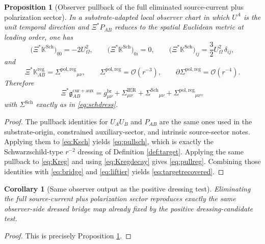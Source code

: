 \documentclass[11pt]{article}
\newcommand{\BridgeMetric}{\mathfrak g}
\newcommand{\ObserverMap}{\Xi}
\newcommand{\ProjSub}{P}
\newcommand{\CoulPot}{U_\Omega}
\newcommand{\SigmaIER}{\Sigma^{\mathrm{IER}}}
\newcommand{\SigmaDressSch}{\Sigma^{\mathrm{Sch}}}
\newcommand{\SigmaRegPol}{\Sigma^{\mathrm{pol,reg}}}
\newcommand{\AuxPol}{\mathbb K}
\newtheorem{proposition}{Proposition}
\newtheorem{corollary}{Corollary}
\begin{document}
\begin{proposition}[Observer pullback of the full eliminated source-current plus polarization sector]
\label{prop:pullback}
In a substrate-adapted local observer chart in which \(U^A\) is the unit temporal direction and \(\ObserverMap^\ast\ProjSub_{AB}\) reduces to the spatial Euclidean metric at leading order, one has
\begin{equation}
\bigl(\ObserverMap^\ast\AuxPol^{\mathrm{Sch}}\bigr)_{00}
=
-2\CoulPot^2,
\qquad
\bigl(\ObserverMap^\ast\AuxPol^{\mathrm{Sch}}\bigr)_{0i}
=
0,
\qquad
\bigl(\ObserverMap^\ast\AuxPol^{\mathrm{Sch}}\bigr)_{ij}
=
\frac32\CoulPot^2\,\delta_{ij},
\label{eq:pullsch}
\end{equation}
and
\begin{equation}
\ObserverMap^\ast\AuxPol_{AB}^{\mathrm{reg}}
=
\SigmaRegPol{}_{\mu\nu},
\qquad
\SigmaRegPol=\mathcal O(r^{-3}),
\qquad
\partial\SigmaRegPol=\mathcal O(r^{-4}).
\label{eq:pullreg}
\end{equation}
Therefore
\begin{equation}
\ObserverMap^\ast \BridgeMetric_{AB}^{\mathrm{cur+aux}}
=
g_{\mu\nu}^{\mathrm{br}}
+\SigmaIER_{\mu\nu}
+\SigmaDressSch{}_{\mu\nu}
+\SigmaRegPol{}_{\mu\nu},
\label{eq:targetrecovered}
\end{equation}
with \(\SigmaDressSch\) exactly as in \eqref{eq:schdress}.
\end{proposition}

\begin{proof}
The pullback identities for \(U_AU_B\) and \(\ProjSub_{AB}\) are the same ones used in the substrate-origin, constrained auxiliary-sector, and intrinsic source-sector notes. Applying them to \eqref{eq:Ksch} yields \eqref{eq:pullsch}, which is exactly the Schwarzschild-type \(r^{-2}\) dressing of Definition \ref{def:target}. Applying the same pullback to \eqref{eq:Kreg} and using \eqref{eq:Kregdecay} gives \eqref{eq:pullreg}. Combining those identities with \eqref{eq:bridge} and \eqref{eq:liftier} yields \eqref{eq:targetrecovered}.
\end{proof}

\begin{corollary}[Same observer output as the positive dressing test]
\label{cor:sameoutput}
Eliminating the full source-current plus polarization sector reproduces exactly the same observer-side dressed bridge map already fixed by the positive dressing-candidate test.
\end{corollary}

\begin{proof}
This is precisely Proposition \ref{prop:pullback}.
\end{proof}
\end{document}

